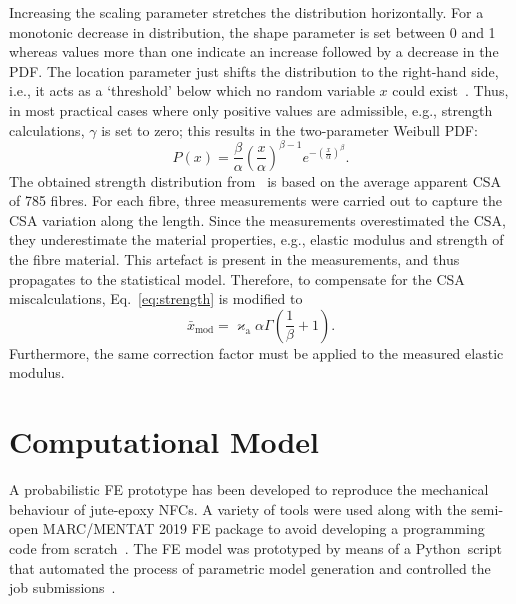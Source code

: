     Increasing the scaling parameter stretches the distribution horizontally. For a monotonic decrease in distribution, the shape parameter is set between 0 and 1 whereas values more than one indicate an increase followed by a decrease in the PDF. The location parameter just shifts the distribution to the right-hand side, i.e., it acts as a `threshold' below which no random variable $x$ could exist~\autocite{Milton.2003}. Thus, in most practical cases where only positive values are admissible, e.g., strength calculations, $\gamma$ is set to zero; this results in the two-parameter Weibull PDF:
    \begin{equation}
        P(x)=\frac{\beta}{\alpha}\left(\frac{x}{\alpha}\right)^{\beta-1}e^{-\left(\frac{x}{\alpha}\right)^\beta}.
    \end{equation}    
     The obtained strength distribution from~\autocite{Virk.2013b} is based on the average apparent CSA of 785 fibres. For each fibre, three measurements were carried out to capture the CSA variation along the length. Since the measurements overestimated the CSA, they underestimate the material properties, e.g., elastic modulus and strength of the fibre material. This artefact is present in the measurements, and thus propagates to the statistical model. Therefore, to compensate for the CSA miscalculations, Eq.~\eqref{eq:strength} is modified to
    \begin{equation}
       	\bar{x}_\text{mod}=\varkappa_\text{a}\alpha \Gamma\left(\frac{1}{\beta}+1\right).\label{eq:strengthcorrected}
    \end{equation}
	Furthermore, the same correction factor must be applied to the measured elastic modulus.

\section{Computational Model}
	A probabilistic FE prototype has been developed to reproduce the mechanical behaviour of jute-epoxy NFCs. A variety of tools were used along with the semi-open MARC/MENTAT 2019 FE package to avoid developing a programming code from scratch~\autocite{Javanbakht.2017}. The FE model was prototyped by means of a Python~script that automated the process of parametric model generation and controlled the job submissions~\autocite{Javanbakht.2016}. 
	
